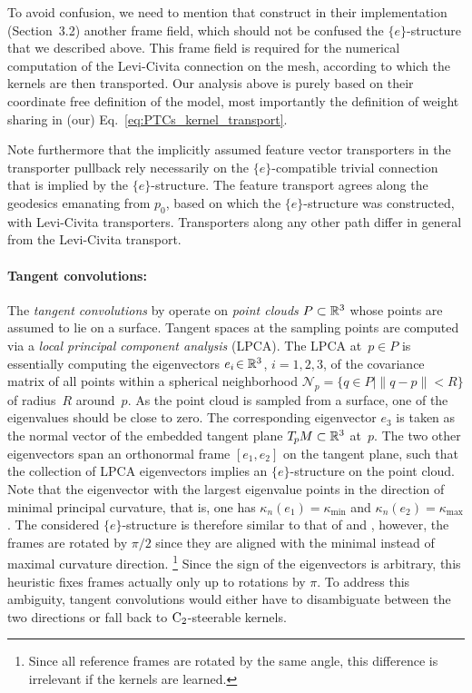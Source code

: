 To avoid confusion, we need to mention that \citet{schonsheck2018parallel} construct in their implementation (Section~3.2) another frame field, which should not be confused the $\{e\}$-structure that we described above.
This frame field is required for the numerical computation of the Levi-Civita connection on the mesh, according to which the kernels are then transported.
Our analysis above is purely based on their coordinate free definition of the model, most importantly the definition of weight sharing in (our) Eq.~\eqref{eq:PTCs_kernel_transport}.

Note furthermore that the implicitly assumed feature vector transporters in the transporter pullback rely necessarily on the $\{e\}$-compatible trivial connection that is implied by the $\{e\}$-structure.
The feature transport agrees along the geodesics emanating from $p_0$, based on which the $\{e\}$-structure was constructed, with Levi-Civita transporters.
Transporters along any other path differ in general from the Levi-Civita transport.





\paragraph{Tangent convolutions:}
The \emph{tangent convolutions} by \citet{tatarchenko2018tangent} operate on \emph{point clouds} ${P\subset \mathbb{R}^3}$ whose points are assumed to lie on a surface.
Tangent spaces at the sampling points are computed via a \emph{local principal component analysis} (LPCA).
The LPCA at~$p\in P$ is essentially computing the \mbox{eigenvectors} ${e_i \!\in \mathbb{R}^3}$, ${i=\!1,2,3}$, of the covariance matrix of all points within a spherical neighborhood ${\mathcal{N}_p =} {\{q\in P | \lVert q-p\rVert<R \}}$ of radius~$R$ around~$p$.
As the point cloud is sampled from a surface, one of the eigenvalues should be close to zero.
The corresponding eigenvector $e_3$ is taken as the normal vector of the embedded tangent plane $T_{\mkern-1.5mu p}\mkern-.5muM \subset \mathbb{R}^3$ at~$p$.
The two other eigenvectors span an orthonormal frame $[e_1,e_2]$ on the tangent plane, such that the collection of LPCA eigenvectors implies an $\{e\}$-structure on the point cloud.
Note that the eigenvector with the largest eigenvalue points in the direction of minimal principal curvature, that is, one has $\kappa_n(e_1) = \kappa_{\min}$ and $\kappa_n(e_2) = \kappa_{\max}$.
The considered $\{e\}$-structure is therefore similar to that of \citet{boscaini2015learning} and \citet{monti2017geometric}, however, the frames are rotated by $\pi/2$ since they are aligned with the minimal instead of maximal curvature direction.%
\footnote{
    Since all reference frames are rotated by the same angle, this difference is irrelevant if the kernels are learned.
}
Since the sign of the eigenvectors is arbitrary, this heuristic fixes frames actually only up to rotations by $\pi$.
To address this ambiguity, tangent convolutions would either have to disambiguate between the two directions or fall back to $\operatorname{C}_{2}$-steerable kernels.

